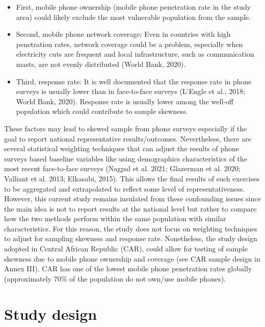 \documentclass[11pt,harvard]{article}
\begin{document}
\begin{itemize}[label=--, left=1.5em]
\item[1.]	First, mobile phone ownership (mobile phone penetration rate in the study area) could likely exclude the most vulnerable population from the sample. 

\item[2.]	Second, mobile phone network coverage; Even in countries with high penetration rates, network coverage could be a problem, especially when electricity cuts are frequent and local infrastructure, such as communication masts, are not evenly distributed (World Bank, 2020).

\item[3.]	Third, response rate: It is well documented that the response rate in phone surveys is usually lower than in face-to-face surveys (L’Engle et al., 2018; World Bank, 2020). Response rate is usually lower among the well-off population which could contribute to sample skewness.
\end{itemize}
 
These factors may lead to skewed sample from phone surveys especially if the goal to report national representative results/outcomes. Nevertheless, there are several statistical weighting techniques that can adjust the results of phone surveys based baseline variables like using demographics characteristics of the most recent face-to-face surveys (Nagpal et al. 2021; Glazerman et al. 2020; Valliant et al. 2013; Elkasabi, 2015). This allows the final results of such exercises to be aggregated and extrapolated to reflect some level of representativeness. However, this current study remains insulated from these confounding issues since the main idea is not to report results at the national level but rather to compare how the two methods perform within the same population with similar characteristics. For this reason, the study does not focus on weighting techniques to adjust for sampling skewness and response rate. Nonetheless, the study design adopted in Central African Republic (CAR), could allow for testing of sample skewness due to mobile phone ownership and coverage (see CAR sample design in Annex III). CAR has one of the lowest mobile phone penetration rates globally (approximately 70\% of the population do not own/use mobile phones).

\pagebreak


\section{Study design}
\end{document}
